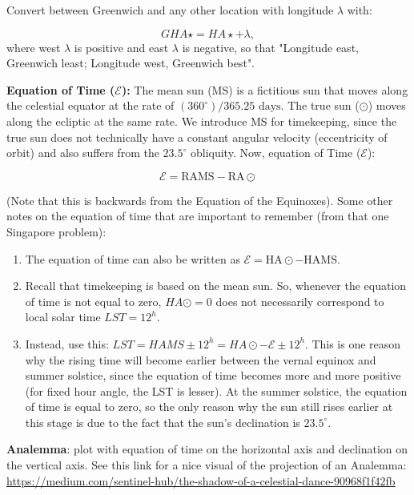 \documentclass[11pt]{article}
\newcommand{\V}{

\vspace{\baselineskip}

}
\begin{document}
Convert between Greenwich and any other location with longitude $\lambda$ with: 

\begin{equation*}
    GHA\star = HA\star + \lambda,
\end{equation*}
where west $\lambda$ is positive and east $\lambda$ is negative, so that "Longitude east, Greenwich least; Longitude west, Greenwich best".\V

\textbf{Equation of Time ($\mathcal{E}$):} The mean sun (MS) is a fictitious sun that moves along the celestial equator at the rate of $(360^{\circ})/365.25\text{ days}$. The true sun ($\odot$) moves along the ecliptic at the same rate. We introduce MS for timekeeping, since the true sun does not technically have a constant angular velocity (eccentricity of orbit) and also suffers from the $23.5^{\circ}$ obliquity. Now, equation of Time ($\mathcal{E}$):

\[\mathcal{E} = \text{RAMS} - \text{RA}\odot\]

(Note that this is backwards from the Equation of the Equinoxes). Some other notes on the equation of time that are important to remember (from that one Singapore problem): 
\begin{enumerate}
    \item The equation of time can also be written as $\mathcal{E} = \text{HA}\odot - \text{HAMS}$. 
    \item Recall that timekeeping is based on the mean sun. So, whenever the equation of time is not equal to zero, $HA\odot = 0$ does not necessarily correspond to local solar time $LST = 12^{h}$.
    \item Instead, use this: $LST = HAMS \pm 12^{h} = HA\odot - \mathcal{E} \pm 12^{h}$. This is one reason why the rising time will become earlier between the vernal equinox and summer solstice, since the equation of time becomes more and more positive (for fixed hour angle, the LST is lesser). At the summer solstice, the equation of time is equal to zero, so the only reason why the sun still rises earlier at this stage is due to the fact that the sun's declination is $23.5^{\circ}$.
\end{enumerate}


\V




\textbf{Analemma}: plot with equation of time on the horizontal axis and declination on the vertical axis. See this link for a nice visual of the projection of an Analemma: \href{https://medium.com/sentinel-hub/the-shadow-of-a-celestial-dance-90968f1f42fb}{https://medium.com/sentinel-hub/the-shadow-of-a-celestial-dance-90968f1f42fb}\V
\end{document}
